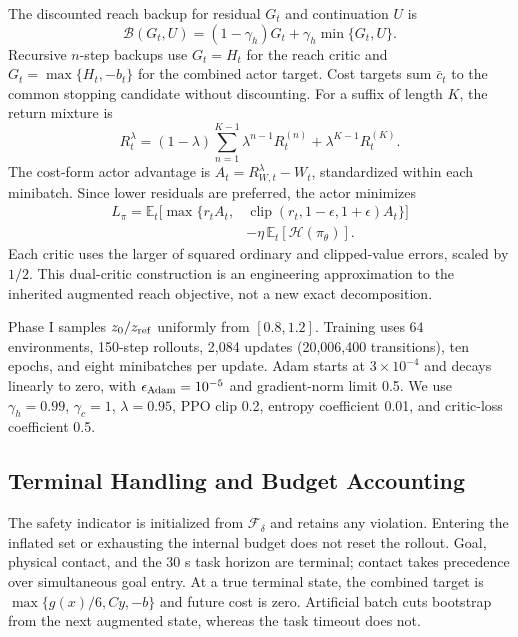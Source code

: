 \documentclass[conference]{IEEEtran}
\begin{document}
The discounted reach backup for residual $G_t$ and continuation $U$ is
\begin{equation}
\mathcal{B}(G_t,U)=(1-\gamma_h)G_t+
\gamma_h\min\{G_t,U\}.
\end{equation}
Recursive $n$-step backups use $G_t=H_t$ for the reach critic and
$G_t=\max\{H_t,-b_t\}$ for the combined actor target. Cost targets sum
$\bar c_t$ to the common stopping candidate without discounting. For a
suffix of length $K$, the return mixture is
\begin{equation}
R_t^\lambda=(1-\lambda)\sum_{n=1}^{K-1}\lambda^{n-1}R_t^{(n)}
+\lambda^{K-1}R_t^{(K)}.
\end{equation}
The cost-form actor advantage is $A_t=R_{W,t}^\lambda-W_t$, standardized
within each minibatch. Since lower residuals are preferred, the actor minimizes
\begin{equation}
\begin{split}
L_\pi=\mathbb{E}_t\big[\max\{r_t A_t,&
\operatorname{clip}(r_t,1-\epsilon,1+\epsilon)A_t\}\big]\\
&-\eta\,\mathbb{E}_t[\mathcal H(\pi_\theta)] .
\end{split}
\end{equation}
Each critic uses the larger of squared ordinary and clipped-value errors,
scaled by $1/2$. This dual-critic construction is an engineering approximation
to the inherited augmented reach objective, not a new exact decomposition.

Phase I samples $z_0/z_{\rm ref}$ uniformly from $[0.8,1.2]$.
Training uses 64 environments, 150-step rollouts, 2,084 updates
(20,006,400 transitions), ten epochs, and eight minibatches per update.
Adam starts at $3\times10^{-4}$ and decays linearly to zero, with
$\epsilon_{\rm Adam}=10^{-5}$ and gradient-norm limit 0.5.
We use $\gamma_h=0.99$, $\gamma_c=1$, $\lambda=0.95$,
PPO clip 0.2, entropy coefficient 0.01, and critic-loss coefficient 0.5.

\subsection{Terminal Handling and Budget Accounting}
\label{app:termination_budget}
The safety indicator is initialized from $\mathcal F_\delta$ and retains
any violation. Entering the inflated set or exhausting the internal budget
does not reset the rollout. Goal, physical contact, and the 30 s task horizon
are terminal; contact takes precedence over simultaneous goal entry.
At a true terminal state, the combined target is
$\max\{g(x)/6,Cy,-b\}$ and future cost is zero. Artificial batch cuts
bootstrap from the next augmented state, whereas the task timeout does not.
\end{document}
